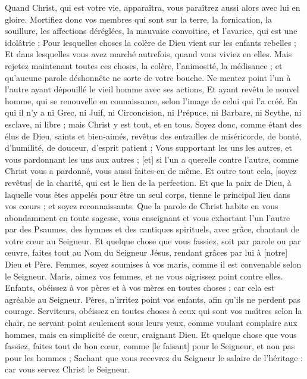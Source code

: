 \begin{multicols}{2}
Quand Christ, qui est votre vie, apparaîtra, vous paraîtrez aussi alors avec lui en gloire.
Mortifiez donc vos membres qui sont sur la terre, la fornication, la souillure, les affections déréglées, la mauvaise convoitise, et l'avarice, qui est une idolâtrie ;
Pour lesquelles choses la colère de Dieu vient sur les enfants rebelles ;
Et dans lesquelles vous avez marché autrefois, quand vous viviez en elles.
Mais rejetez maintenant toutes ces choses, la colère, l'animosité, la médisance ; et qu'aucune parole déshonnête ne sorte de votre bouche.
Ne mentez point l'un à l'autre ayant dépouillé le vieil homme avec ses actions,
Et ayant revêtu le nouvel homme, qui se renouvelle en connaissance, selon l'image de celui qui l'a créé.
En qui il n'y a ni Grec, ni Juif, ni Circoncision, ni Prépuce, ni Barbare, ni Scythe, ni esclave, ni libre ; mais Christ y est tout, et en tous.
Soyez donc, comme étant des élus de Dieu, saints et bien-aimés, revêtus des entrailles de miséricorde, de bonté, d'humilité, de douceur, d'esprit patient ;
Vous supportant les uns les autres, et vous pardonnant les uns aux autres ; [et] si l'un a querelle contre l'autre, comme Christ vous a pardonné, vous aussi faites-en de même.
Et outre tout cela, [soyez revêtus] de la charité, qui est le lien de la perfection.
Et que la paix de Dieu, à laquelle vous êtes appelés pour être un seul corps, tienne le principal lieu dans vos cœurs ; et soyez reconnaissants.
Que la parole de Christ habite en vous abondamment en toute sagesse, vous enseignant et vous exhortant l'un l'autre par des Psaumes, des hymnes et des cantiques spirituels, avec grâce, chantant de votre cœur au Seigneur.
Et quelque chose que vous fassiez, soit par parole ou par œuvre, faites tout au Nom du Seigneur Jésus, rendant grâces par lui à [notre] Dieu et Père.
Femmes, soyez soumises à vos maris, comme il est convenable selon le Seigneur.
Maris, aimez vos femmes, et ne vous aigrissez point contre elles.
Enfants, obéissez à vos pères et à vos mères en toutes choses ; car cela est agréable au Seigneur.
Pères, n'irritez point vos enfants, afin qu'ils ne perdent pas courage.
Serviteurs, obéissez en toutes choses à ceux qui sont vos maîtres selon la chair, ne servant point seulement sous leurs yeux, comme voulant complaire aux hommes, mais en simplicité de cœur, craignant Dieu.
Et quelque chose que vous fassiez, faites tout de bon cœur, comme [le faisant] pour le Seigneur, et non pas pour les hommes ;
Sachant que vous recevrez du Seigneur le salaire de l'héritage : car vous servez Christ le Seigneur.

\end{multicols}
